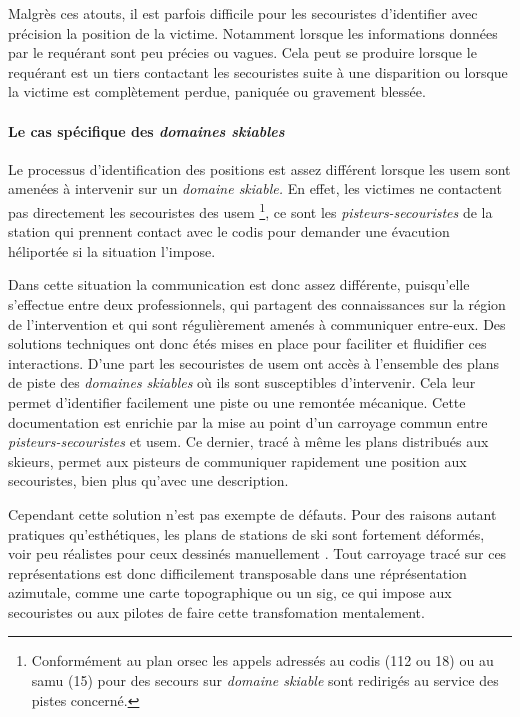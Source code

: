 Malgrès ces atouts, il est parfois difficile pour les secouristes
d'identifier avec précision la position de la victime. Notamment
lorsque les informations données par le requérant sont peu précies ou
vagues. Cela peut se produire lorsque le requérant est un tiers
contactant les secouristes suite à une disparition ou lorsque la
victime est complètement perdue, paniquée ou gravement blessée.

\paragraph{Le cas spécifique des \emph{domaines skiables}}

Le processus d'identification des positions est assez différent
lorsque les \ac{usem} sont amenées à intervenir sur un \emph{domaine
  skiable.} En effet, les victimes ne contactent pas directement les
secouristes des \ac{usem} \footnote{Conformément au plan \ac{orsec}
  les appels adressés au \ac{codis} (112 ou 18) ou au \ac{samu} (15)
  pour des secours sur \emph{domaine skiable} sont redirigés au
  service des pistes concerné.}, ce sont les
\emph{pisteurs-secouristes} de la station qui prennent contact avec le
\ac{codis} pour demander une évacution héliportée si la situation
l'impose.

Dans cette situation la communication est donc assez différente,
puisqu'elle s'effectue entre deux professionnels, qui partagent des
connaissances sur la région de l'intervention et qui sont
régulièrement amenés à communiquer entre-eux. Des solutions techniques
ont donc étés mises en place pour faciliter et fluidifier ces
interactions. D'une part les secouristes de \ac{usem} ont accès à
l'ensemble des plans de piste des \emph{domaines skiables} où ils sont
susceptibles d'intervenir. Cela leur permet d'identifier facilement
une piste ou une remontée mécanique. Cette documentation est enrichie
par la mise au point d'un carroyage commun entre
\emph{pisteurs-secouristes} et \ac{usem}. Ce dernier, tracé à même les
plans distribués aux skieurs, permet aux pisteurs de communiquer
rapidement une position aux secouristes, bien plus qu'avec une
description.

Cependant cette solution n'est pas exempte de défauts. Pour des
raisons autant pratiques qu’esthétiques, les plans de stations de ski
sont fortement déformés, voir peu réalistes pour ceux dessinés
manuellement \autocite{Gauchon2014,LaPorte2017}. Tout carroyage tracé
sur ces représentations est donc difficilement transposable dans une
réprésentation azimutale, comme une carte topographique ou un
\ac{sig}, ce qui impose aux secouristes ou aux pilotes de faire cette
transfomation mentalement.

